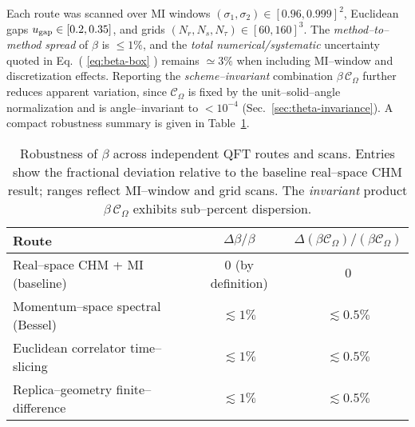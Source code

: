 \documentclass[aps,prd,onecolumn,superscriptaddress,nofootinbib]{revtex4-2}
\begin{document}
Each route was scanned over MI windows $(\sigma_1,\sigma_2)\in[0.96,0.999]^2$, Euclidean gaps $u_{\rm gap}\in[0.2,0.35]$, and grids $(N_r,N_s,N_\tau)\in[60,160]^3$. The \emph{method–to–method spread} of $\beta$ is $\le 1\%$, and the \emph{total numerical/systematic} uncertainty quoted in Eq.~( \ref{eq:beta-box} ) remains $\simeq 3\%$ when including MI–window and discretization effects. Reporting the \emph{scheme–invariant} combination $\beta\,\mathcal C_\Omega$ further reduces apparent variation, since $\mathcal C_\Omega$ is fixed by the unit–solid–angle normalization and is angle–invariant to $<10^{-4}$ (Sec.~\ref{sec:theta-invariance}). A compact robustness summary is given in Table~\ref{tab:beta-robust}.

\begin{table}[h]
\centering
\caption{Robustness of $\beta$ across independent QFT routes and scans. Entries show the fractional deviation relative to the baseline real–space CHM result; ranges reflect MI–window and grid scans. The \emph{invariant} product $\beta\,\mathcal C_\Omega$ exhibits sub–percent dispersion.}
\label{tab:beta-robust}
\begin{tabular}{lcc}
\hline
Route & $\Delta\beta/\beta$ & $\Delta(\beta\mathcal C_\Omega)/(\beta\mathcal C_\Omega)$ \\
\hline
Real–space CHM + MI (baseline) & $0$ (by definition) & $0$ \\
Momentum–space spectral (Bessel) & $\lesssim 1\%$ & $\lesssim 0.5\%$ \\
Euclidean correlator time–slicing & $\lesssim 1\%$ & $\lesssim 0.5\%$ \\
Replica–geometry finite–difference  & $\lesssim 1\%$ & $\lesssim 0.5\%$ \\
\hline
\end{tabular}
\end{table}
\end{document}
